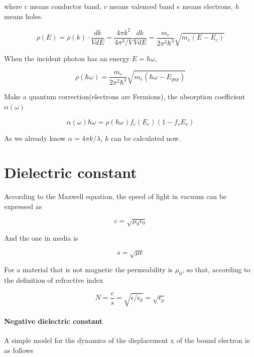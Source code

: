 \documentclass{article}
\begin{document}
			where $c$ means conductor band, $v$ means valenced band $e$ means electrons, $h$ means holes.

			\begin{equation}
				\rho(E) = \rho(k)\cdot\frac{dk}{VdE} = \frac{4\pi k^{2}}{4\pi^{3}/V}\frac{dk}{VdE} = \frac{m_{e}}{2\pi^{2}\hbar^{3}}\sqrt{m_{e}(E - E_{c})}
			\end{equation}

			When the incident photon has an energy $E = \hbar\omega$,

			\begin{equation}
				\rho(\hbar\omega) = \frac{m_{e}}{2\pi^{2}\hbar^{3}}\sqrt{m_{e}(\hbar\omega - E_{gap})}
			\end{equation}

			Make a quantum correction(electrons are Fermions), the absorption coefficient $\alpha(\omega)$
			
			\begin{equation}
				\alpha(\omega)\hbar\omega = \rho(\hbar\omega)f_{c}(E_{c})(1 - f_{v}E_{v})
			\end{equation}

			As we already know $\alpha = 4\pi k/\lambda$, $k$ can be calculated now.


	\section{Dielectric constant}

		According to the Maxwell equation, the speed of light in vacuum can be expressed as

		\begin{equation}
			c = \sqrt{\mu_{0}\epsilon_{0}}
		\end{equation}

		And the one in media is

		\begin{equation}
			s = \sqrt{\mu\epsilon}
		\end{equation}

		For a material that is not magnetic the permeability is $\mu_{0}$, so that, according to the definition of refractive index

		\begin{equation}
			N = \frac{c}{s} = \sqrt{\epsilon/\epsilon_{0}} = \sqrt{\epsilon_{p}}
		\end{equation}

		\paragraph{Negative dielectric constant}
			A simple model for the dynamics of the displacement x of the bound electron is as follows
\end{document}
